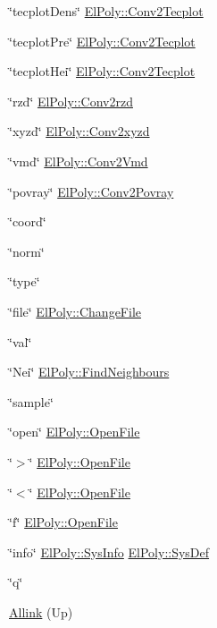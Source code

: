 \begin{DoxyItemize}
\item \char`\"{}tecplot\+Dens\char`\"{} \hyperlink{classElPoly_ab03f8f580a4b45968aedcaa0d088c469}{El\+Poly\+::\+Conv2\+Tecplot} 
\item \char`\"{}tecplot\+Pre\char`\"{} \hyperlink{classElPoly_ab03f8f580a4b45968aedcaa0d088c469}{El\+Poly\+::\+Conv2\+Tecplot} 
\item \char`\"{}tecplot\+Hei\char`\"{} \hyperlink{classElPoly_ab03f8f580a4b45968aedcaa0d088c469}{El\+Poly\+::\+Conv2\+Tecplot} 
\item \char`\"{}rzd\char`\"{} \hyperlink{classElPoly_a538747fd3f643c9d171a00a5ec371ccc}{El\+Poly\+::\+Conv2rzd} 
\item \char`\"{}xyzd\char`\"{} \hyperlink{classElPoly_ad9aa947dfbb4fd8d4f2eb314efc17730}{El\+Poly\+::\+Conv2xyzd} 
\item \char`\"{}vmd\char`\"{} \hyperlink{classElPoly_a552193e7b9dea6d667fc1cd2ecab1482}{El\+Poly\+::\+Conv2\+Vmd} 
\item \char`\"{}povray\char`\"{} \hyperlink{classElPoly_ac2e836951a966bd69b21705cad363b95}{El\+Poly\+::\+Conv2\+Povray} 
\item \char`\"{}coord\char`\"{} 
\item \char`\"{}norm\char`\"{} 
\item \char`\"{}type\char`\"{} 
\item \char`\"{}file\char`\"{} \hyperlink{classElPoly_a5fa485410c0b7e02f523f96f33504435}{El\+Poly\+::\+Change\+File} 
\item \char`\"{}val\char`\"{} 
\item \char`\"{}\+Nei\char`\"{} \hyperlink{classVarData_ac99cf9cb839b06e0c3e32ebb8d11d6be}{El\+Poly\+::\+Find\+Neighbours} 
\item \char`\"{}sample\char`\"{} 
\item \char`\"{}open\char`\"{} \hyperlink{classElPoly_a3432306726a27b310ec27b3900894b11}{El\+Poly\+::\+Open\+File} 
\item \char`\"{}$>$\char`\"{} \hyperlink{classElPoly_a3432306726a27b310ec27b3900894b11}{El\+Poly\+::\+Open\+File} 
\item \char`\"{}$<$\char`\"{} \hyperlink{classElPoly_a3432306726a27b310ec27b3900894b11}{El\+Poly\+::\+Open\+File} 
\item \char`\"{}f\char`\"{} \hyperlink{classElPoly_a3432306726a27b310ec27b3900894b11}{El\+Poly\+::\+Open\+File} 
\item \char`\"{}info\char`\"{} \hyperlink{classVarData_a4dd85f1789027793b97a591acc9caf30}{El\+Poly\+::\+Sys\+Info} \hyperlink{classVarData_aa415b42b89dfba2ab8189be4e86b41ad}{El\+Poly\+::\+Sys\+Def} 
\item \char`\"{}q\char`\"{}


\end{DoxyItemize}


\begin{DoxyItemize}
\item \hyperlink{index}{Allink} (Up)  
\end{DoxyItemize}